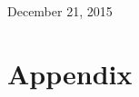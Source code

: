 \documentclass[12pt,letterpaper,notitlepage]{article}
\begin{document}
\begin{titlepage}



{\large December 21, 2015}\\[2cm] %



\vfill %

\end{titlepage}
\tableofcontents

\section{Appendix}
%
\end{document}
